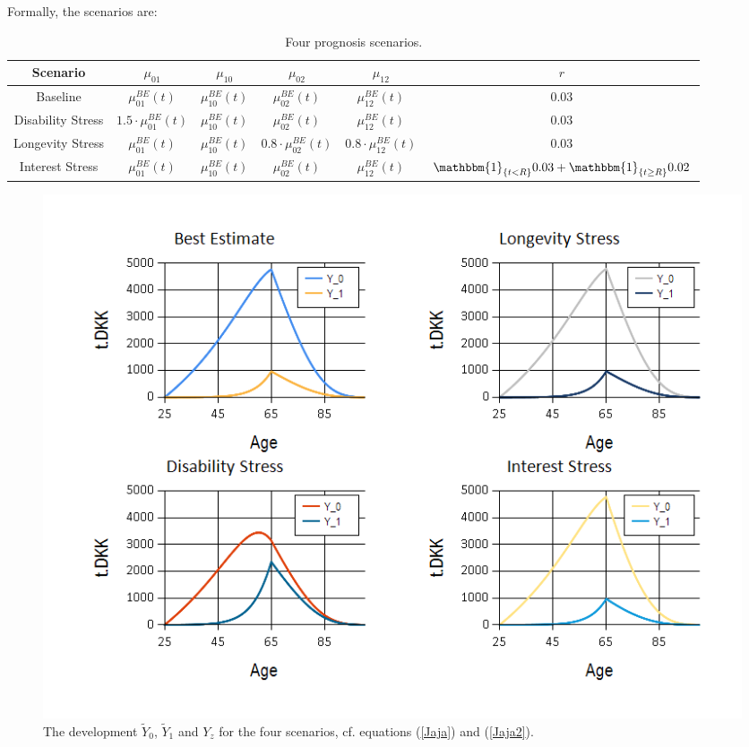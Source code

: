 \documentclass{article}
\newcommand{\1}[1]{\mathbbm{1}_{\left\lbrace #1 \right\rbrace}}
\theoremstyle{break}
\theoremstyle{remark}
\numberwithin{equation}{section}
\begin{document}
Formally, the scenarios are:

\begin{table}[H]
	\caption{Four prognosis scenarios.}
	\begin{center}
	\begin{tabular}{ |c|c|c|c|c|c| }
		\hline
		Scenario & $\mu_{01}$ & $\mu_{10}$ & $\mu_{02}$ & $\mu_{12}$ & $r$ \\
		\hline
		Baseline & $\mu_{01}^{BE}(t)$ & $\mu_{10}^{BE}(t)$ & $\mu_{02}^{BE}(t)$ &$\mu_{12}^{BE}(t)$ & 0.03 \\
		Disability Stress & $1.5 \cdot \mu_{01}^{BE}(t)$ & $\mu_{10}^{BE}(t)$ & $\mu_{02}^{BE}(t)$ & $\mu_{12}^{BE}(t)$ & 0.03 \\
		Longevity Stress & $\mu_{01}^{BE}(t)$ & $\mu_{10}^{BE}(t)$ & $0.8 \cdot \mu_{02}^{BE}(t)$ & $0.8 \cdot \mu_{12}^{BE}(t)$ & 0.03 \\
		Interest Stress & $\mu_{01}^{BE}(t)$ & $\mu_{10}^{BE}(t)$ & $\mu_{02}^{BE}(t)$ & $\mu_{12}^{BE}(t)$ & $\1{t < R} 0.03 + \1{t \geq R} 0.02$ \\
		\hline
	\end{tabular}
\newline
\end{center}
\end{table}

\begin{figure}[H]
	\centering
	\caption{The development $\tilde{Y}_0$, $\tilde{Y}_1$ and $Y_z$ for the four scenarios, cf. equations (\ref{Jaja}) and (\ref{Jaja2}).}
	\includegraphics[width=\textwidth]{Reserves}
\end{figure}
\end{document}
